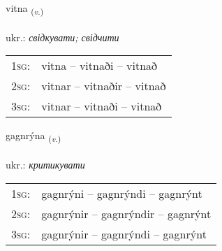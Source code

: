 \documentclass[frontgrid, backgrid]{flacards}\usepackage[]{graphicx}\usepackage[]{xcolor}
\begin{document}
\renewcommand{\flhead}{\vskip5pt \fboxsep=0pt {\small\bfseries\footnotesize Sagnorð | дієслово}}
\renewcommand{\fcfoot}{\vskip5pt \fboxsep=0pt \hspace{2pt}{\small\bfseries\footnotesize 2K}}

\renewcommand{\blhead}{\vskip5pt {\small\bfseries\footnotesize Sagnorð | дієслово }}
\renewcommand{\bcfoot}{\vskip5pt \hspace{2pt}{\small\bfseries\footnotesize 2K}}


{vitna \small{\textsubscript{(\textit{v.})}} \\[1ex] %
\textphonetic{[vɪhtna]} \\
ukr.: \emph{свідкувати; свідчити} \\  [2ex]
\renewcommand*{\arraystretch}{0.8}
\begin{tabular}{p{1cm}l}
\textsc{1sg}: & vitna -- vitnaði -- vitnað \\ 
\textsc{2sg}: & vitnar -- vitnaðir -- vitnað \\ 
\textsc{3sg}: & vitnar -- vitnaði -- vitnað \\ 
\end{tabular}
}

\renewcommand{\flhead}{\vskip5pt \fboxsep=0pt {\small\bfseries\footnotesize Sagnorð | дієслово}}
\renewcommand{\fcfoot}{\vskip5pt \fboxsep=0pt \hspace{2pt}{\small\bfseries\footnotesize 2K}}

\renewcommand{\blhead}{\vskip5pt {\small\bfseries\footnotesize Sagnorð | дієслово }}
\renewcommand{\bcfoot}{\vskip5pt \hspace{2pt}{\small\bfseries\footnotesize 2K}}


{gagnrýna \small{\textsubscript{(\textit{v.})}} \\[1ex] %
\textphonetic{[kakrina]} \\
ukr.: \emph{критикувати} \\  [2ex]
\renewcommand*{\arraystretch}{0.8}
\begin{tabular}{p{1cm}l}
\textsc{1sg}: & gagnrýni -- gagnrýndi -- gagnrýnt \\ 
\textsc{2sg}: & gagnrýnir -- gagnrýndir -- gagnrýnt \\ 
\textsc{3sg}: & gagnrýnir -- gagnrýndi -- gagnrýnt \\ 
\end{tabular}
}
\end{document}
